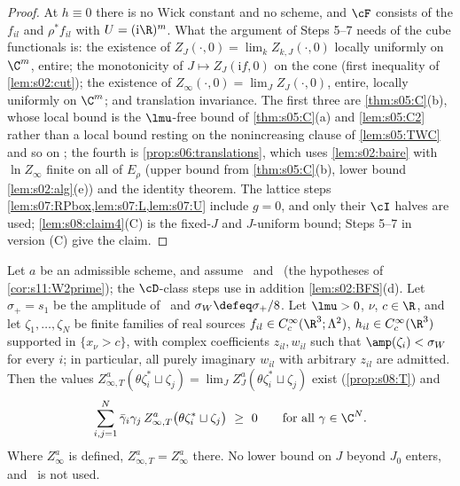 \begin{proof}
At $h\equiv0$ there is no Wick constant and no scheme, and $\cF$ consists of the $f_{il}$ and $\rho^*f_{il}$ with $U=(\mathrm i\R)^{m}$. What the argument of Steps 5--7 needs of the cube functionals is: the existence of $Z_J(\cdot,0)=\lim_kZ_{k,J}(\cdot,0)$ locally uniformly on $\C^m$, entire; the monotonicity of $J\mapsto Z_J(\mathrm if,0)$ on the cone (first inequality of \cref{lem:s02:cut}); the existence of $Z_\infty(\cdot,0)=\lim_JZ_J(\cdot,0)$, entire, locally uniformly on $\C^m$; and translation invariance. The first three are \cref{thm:s05:C}(b), whose local bound is the $\lmu$-free bound of \cref{thm:s05:C}(a) and \cref{lem:s05:C2} rather than a local bound resting on the nonincreasing clause of \cref{lem:s05:TWC} and so on \cite[Thm.~6.2(3),(4)]{BFS1}; the fourth is \cref{prop:s06:translations}, which uses \cref{lem:s02:baire} with $\ln Z_\infty$ finite on all of $E_\rho$ (upper bound from \cref{thm:s05:C}(b), lower bound \cref{lem:s02:alg}(e)) and the identity theorem. The lattice steps \cref{lem:s07:RPbox,lem:s07:L,lem:s07:U} include $g=0$, and only their $\cI$ halves are used; \cref{lem:s08:claim4}(C) is the fixed-$J$ and $J$-uniform bound; Steps 5--7 in version (C) give the claim.
\end{proof}

\begin{theorem}\label{thm:s08:OS2WT}
Let $a$ be an admissible scheme, and assume \Itwo\ and \Ithree\ (the hypotheses of \cref{cor:s11:W2prime}); the $\cD$-class steps use in addition \cref{lem:s02:BFS}(d). Let $\sigma_+=s_1$ be the amplitude of \Itwo\ and $\sigma_W\defeq\sigma_+/8$. Let $\lmu>0$, $\nu$, $c\in\R$, and let $\zeta_1,\dots,\zeta_N$ be finite families of real sources $f_{il}\in C^\infty_c(\R^3;\Lambda^2)$, $h_{il}\in C^\infty_c(\R^3)$ supported in $\{x_\nu>c\}$, with complex coefficients $z_{il},w_{il}$ such that $\amp(\zeta_i)<\sigma_W$ for every $i$; in particular, all purely imaginary $w_{il}$ with arbitrary $z_{il}$ are admitted. Then the values $Z^a_{\infty,T}(\theta\zeta_i^*\sqcup\zeta_j)=\lim_JZ^a_J(\theta\zeta_i^*\sqcup\zeta_j)$ exist (\cref{prop:s08:T}) and
\[
\sum_{i,j=1}^N\bar\gamma_i\gamma_j\,Z^a_{\infty,T}\big(\theta\zeta_i^*\sqcup\zeta_j\big)\ \ge\ 0\qquad\text{for all }\gamma\in\C^N .
\]
Where $Z^a_\infty$ is defined, $Z^a_{\infty,T}=Z^a_\infty$ there. No lower bound on $J$ beyond $J_0$ enters, and \Wtwo\ is not used.
\end{theorem}

